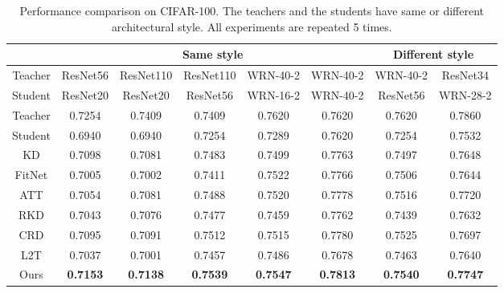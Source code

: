 \begin{table*}
\tabcolsep=0.17cm
\centering
\begin{tabular}{c|ccccc|cc}
\toprule
        & \multicolumn{5}{c|}{\textbf{Same style}}                                   & \multicolumn{2}{c}{\textbf{Different style}}           \\ \midrule
Teacher & \small{ResNet56}        & \small{ResNet110}      & \small{ResNet110}       & \small{WRN-40-2}        & \small{WRN-40-2}     & \small{WRN-40-2}            & \small{ResNet34}                   \\
Student & \small{ResNet20}        & \small{ResNet20}        & \small{ResNet56}        & \small{WRN-16-2}        & \small{WRN-40-2}     & \small{ResNet56}            & \small{WRN-28-2}                   \\ \midrule
Teacher & 0.7254          & 0.7409          & 0.7409          & 0.7620          & 0.7620           & 0.7620              & 0.7860                       \\
Student & 0.6940          & 0.6940          & 0.7254          & 0.7289          & 0.7620           & 0.7254              & 0.7532                       \\ \midrule
KD      & 0.7098          & 0.7081          & 0.7483          & 0.7499          & 0.7763           & 0.7497              & 0.7648                       \\
FitNet  & 0.7005          & 0.7002          & 0.7411          & 0.7522          & 0.7766           & 0.7506              & 0.7644                       \\
ATT     & 0.7054          & 0.7081          & 0.7488          & 0.7520          & 0.7778           & 0.7516              & 0.7720                       \\
RKD     & 0.7043          & 0.7076          & 0.7477          & 0.7459          & 0.7762           & 0.7439              & 0.7632                       \\
CRD     & 0.7095          & 0.7091          & 0.7512          & 0.7515          & 0.7780           & 0.7525              & 0.7697                       \\
L2T     & 0.7037          & 0.7001          & 0.7457          & 0.7486          & 0.7678           & 0.7463              & 0.7640                       \\ \midrule
Ours    & \textbf{0.7153} & \textbf{0.7138} & \textbf{0.7539} & \textbf{0.7547} & \textbf{0.7813} & \textbf{0.7540}     & \textbf{0.7747}     \\ \bottomrule
\end{tabular}
\vspace{0.3em}
\caption{Performance comparison on CIFAR-100. The teachers and the students have same or different architectural style. All experiments are repeated 5 times.}
\label{table:cifar}
\end{table*}


